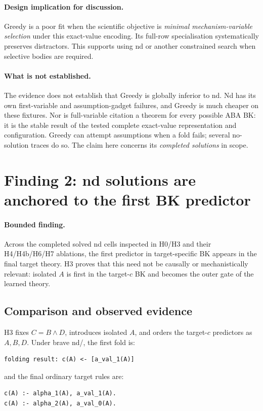 \documentclass[11pt]{article}
\DeclareRobustCommand{\code}[1]{\texttt{\detokenize{#1}}}
\newcommand{\finding}{\paragraph{Bounded finding.}}
\newcommand{\implication}{\paragraph{Design implication for discussion.}}
\newcommand{\boundary}{\paragraph{What is not established.}}
\begin{document}
\implication
Greedy is a poor fit when the scientific objective is \emph{minimal
mechanism-variable selection} under this exact-value encoding. Its full-row
specialisation systematically preserves distractors. This supports using nd
or another constrained search when selective bodies are required.

\boundary
The evidence does not establish that Greedy is globally inferior to nd. Nd has
its own first-variable and assumption-gadget failures, and Greedy is much
cheaper on these fixtures. Nor is full-variable citation a theorem for every
possible ABA BK: it is the stable result of the tested complete exact-value
representation and configuration. Greedy can attempt assumptions when a fold
fails; several no-solution traces do so. The claim here concerns its
\emph{completed solutions} in scope.

\section{Finding 2: nd solutions are anchored to the first BK predictor}

\finding
Across the completed solved nd cells inspected in H0/H3 and their H4/H4b/H6/H7
ablations, the first predictor in target-specific BK appears in the final
target theory. H3 proves that this need not be causally or mechanistically
relevant: isolated \(A\) is first in the target-\(c\) BK and becomes the outer
gate of the learned theory.

\subsection{Comparison and observed evidence}

H3 fixes \(C=B\land D\), introduces isolated \(A\), and orders the target-\(c\)
predictors as \(A,B,D\). Under brave nd/\code{relto}, the first fold is:

\begin{lstlisting}
folding result: c(A) <- [a_val_1(A)]
\end{lstlisting}

and the final ordinary target rules are:

\begin{lstlisting}
c(A) :- alpha_1(A), a_val_1(A).
c(A) :- alpha_2(A), a_val_0(A).
\end{lstlisting}
\end{document}
